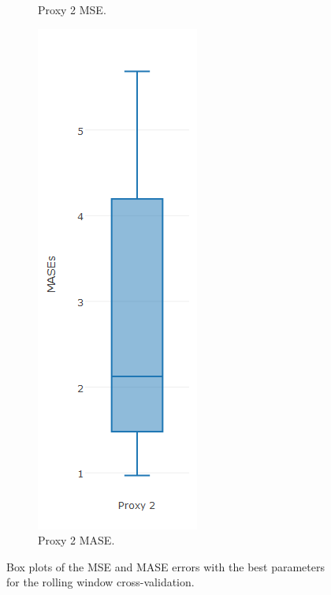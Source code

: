 \begin{figure}[!h]
{\begin{subfigure}{.25\linewidth}
  \caption{Proxy 2 MSE.}
  \label{fig:bp3b}
\end{subfigure}
\begin{subfigure}{.25\linewidth}
  \centering
  \includegraphics[width=\linewidth]{img/6mmaMasebp.png}
  \caption{Proxy 2 MASE.}
  \label{fig:bp4b}
\end{subfigure}}
\caption{Box plots of the MSE and MASE errors with the best parameters for the rolling window cross-validation.}
\end{figure}
